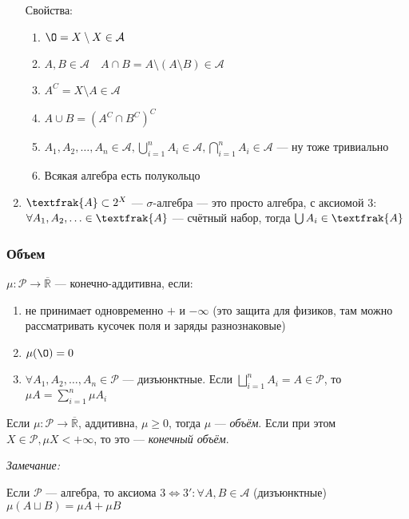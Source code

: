 \documentclass{article}
\begin{document}
\begin{enumerate}
        Свойства: 
        \begin{enumerate}
            \item $\O = X \setminus X \in \mathcal{A}$
            \item $A, B \in \mathcal{A} \quad A \cap B = A \setminus (A \setminus B) \in \mathcal{A}$
            \item $A^C = X \setminus A \in \mathcal{A}$
            \item $A \cup B = (A^C \cap B^C)^C$
            \item $A_1, A_2, \ldots, A_{n} \in \mathcal{A}, \bigcup_{i = 1}^{n} A_i \in \mathcal{A}, \bigcap_{i = 1}^{n} A_i \in \mathcal{A}$ --- ну тоже тривиально
            \item Всякая алгебра есть полукольцо
        \end{enumerate}
    
    \item $\textfrak{A} \subset 2^X$ --- $\sigma$-алгебра --- это просто алгебра, с аксиомой 3: $\forall A_1, A_2, \ldots \in \textfrak{A}$ --- счётный набор, тогда $\bigcup A_i \in \textfrak{A}$
\end{enumerate}

\subsubsection{Объем}

$\mu: \mathcal{P} \rightarrow \overline{\mathbb{R}}$ --- конечно-аддитивна, если: 

\begin{enumerate}
    \item не принимает одновременно $+$ и $- \infty$ (это защита для физиков, там можно рассматривать кусочек поля и заряды разнознаковые)
    \item $\mu(\O) = 0$
    \item $\forall  A_1, A_2, \ldots, A_{n} \in \mathcal{P}$ --- дизъюнктные. Если $\bigsqcup_{i = 1}^{n} A_i = A \in \mathcal{P}$, то $\mu A = \sum_{i = 1}^{n} \mu A_i$
\end{enumerate}

Если $\mu: \mathcal{P} \rightarrow \overline{\mathbb{R}}$, аддитивна, $\mu \ge 0$, тогда $\mu$ --- \textit{объём}. Если при этом $X \in \mathcal{P}, \mu X < + \infty$, то это --- \textit{конечный объём}.

\textit{Замечание:}

Если $\mathcal{P}$ --- алгебра, то аксиома $3 \Leftrightarrow 3': \forall A, B \in \mathcal{A}$ (дизъюнктные) $\mu (A \sqcup B) = \mu A + \mu B$
\end{document}
